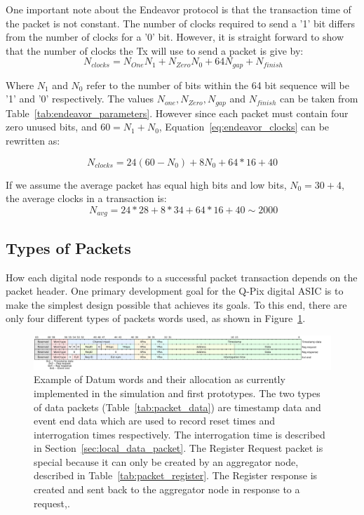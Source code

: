 One important note about the Endeavor protocol is that the transaction time of the packet is not constant.
The number of clocks required to send a '1' bit differs from the number of clocks for a '0' bit.
However, it is straight forward to show that the number of clocks the Tx will use to send a packet is give by:
\begin{equation}~\label{eq:endeavor_clocks}
  N_{clocks} = N_{One}N_{1} + N_{Zero}N_{0} + 64N_{gap} + N_{finish}
\end{equation}

Where $N_{1}$ and $N_{0}$ refer to the number of bits within the 64 bit sequence will be '1' and '0' respectively.
The values $N_{one}, N_{Zero}, N_{gap}$ and $N_{finish}$ can be taken from Table~\ref{tab:endeavor_parameters}.
However since each packet must contain four zero unused bits, and $60 = N_{1} + N_{0}$, Equation~\ref{eq:endeavor_clocks} can be rewritten as:

\begin{equation}
  N_{clocks} = 24(60 - N_{0}) + 8N_{0} + 64*16 + 40
\end{equation}

If we assume the average packet has equal high bits and low bits, $N_{0} = 30 + 4$, the average clocks in a transaction is:
\begin{equation}~\label{eq:avg_packet}
  N_{avg} = 24*28 + 8*34 + 64*16 + 40 \sim 2000 
\end{equation}


\subsection{Types of Packets}\label{sec:digi_packets}
How each digital node responds to a successful packet transaction depends on the packet header.
One primary development goal for the Q-Pix digital ASIC is to make the simplest design possible that achieves its goals.
To this end, there are only four different types of packets words used, as shown in Figure~\ref{fig:datum}.

\begin{figure}[]
\centering
\includegraphics[width=\textwidth]{images/qpix_word_format.pdf}
\caption{Example of Datum words and their allocation as currently implemented in the simulation and first prototypes.
The two types of data packets (Table~\ref{tab:packet_data}) are timestamp data and event end data which are used to record reset times and interrogation times respectively.
The interrogation time is described in Section~\ref{sec:local_data_packet}.
The Register Request packet is special because it can only be created by an aggregator node, described in Table~\ref{tab:packet_register}. 
The Register response is created and sent back to the aggregator node in response to a request,.
}
\label{fig:datum}
\end{figure}

